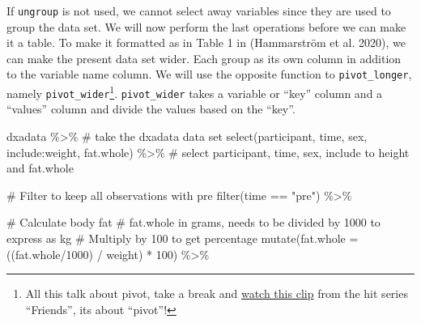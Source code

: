 \documentclass[
  11pt,
  letterpaper,
]{scrbook}
\newenvironment{Shaded}{\begin{snugshade}}{\end{snugshade}}
\newcommand{\AttributeTok}[1]{\textcolor[rgb]{0.40,0.45,0.13}{#1}}
\newcommand{\CommentTok}[1]{\textcolor[rgb]{0.37,0.37,0.37}{#1}}
\newcommand{\DecValTok}[1]{\textcolor[rgb]{0.68,0.00,0.00}{#1}}
\newcommand{\FunctionTok}[1]{\textcolor[rgb]{0.28,0.35,0.67}{#1}}
\newcommand{\NormalTok}[1]{\textcolor[rgb]{0.00,0.23,0.31}{#1}}
\newcommand{\SpecialCharTok}[1]{\textcolor[rgb]{0.37,0.37,0.37}{#1}}
\newcommand{\StringTok}[1]{\textcolor[rgb]{0.13,0.47,0.30}{#1}}
\begin{document}
If \texttt{ungroup} is not used, we cannot select away variables since
they are used to group the data set. We will now perform the last
operations before we can make it a table. To make it formatted as in
Table 1 in (Hammarström et al. 2020), we can make the present data set
wider. Each group as its own column in addition to the variable name
column. We will use the opposite function to \texttt{pivot\_longer},
namely \texttt{pivot\_wider}\footnote{All this talk about pivot, take a
  break and \href{https://www.youtube.com/watch?v=L_PWbnHABsM}{watch
  this clip} from the hit series ``Friends'', its about ``pivot''!}.
\texttt{pivot\_wider} takes a variable or ``key'' column and a
``values'' column and divide the values based on the ``key''.

\begin{Shaded}
\begin{Highlighting}[numbers=left,,]
\NormalTok{dxadata }\SpecialCharTok{\%\textgreater{}\%} \CommentTok{\# take the dxadata data set}
  \FunctionTok{select}\NormalTok{(participant, time, sex, include}\SpecialCharTok{:}\NormalTok{weight, fat.whole) }\SpecialCharTok{\%\textgreater{}\%} 
  \CommentTok{\# select participant, time, sex, include to height and fat.whole}
  
  \CommentTok{\# Filter to keep all observations with pre}
  \FunctionTok{filter}\NormalTok{(time }\SpecialCharTok{==} \StringTok{"pre"}\NormalTok{) }\SpecialCharTok{\%\textgreater{}\%}
  
  \CommentTok{\# Calculate body fat}
  \CommentTok{\# fat.whole in grams, needs to be divided by 1000 to express as kg}
  \CommentTok{\# Multiply by 100 to get percentage}
  \FunctionTok{mutate}\NormalTok{(}\AttributeTok{fat.whole =}\NormalTok{ ((fat.whole}\SpecialCharTok{/}\DecValTok{1000}\NormalTok{) }\SpecialCharTok{/}\NormalTok{ weight) }\SpecialCharTok{*} \DecValTok{100}\NormalTok{) }\SpecialCharTok{\%\textgreater{}\%}
  

\end{Highlighting}
\end{Shaded}
\end{document}

